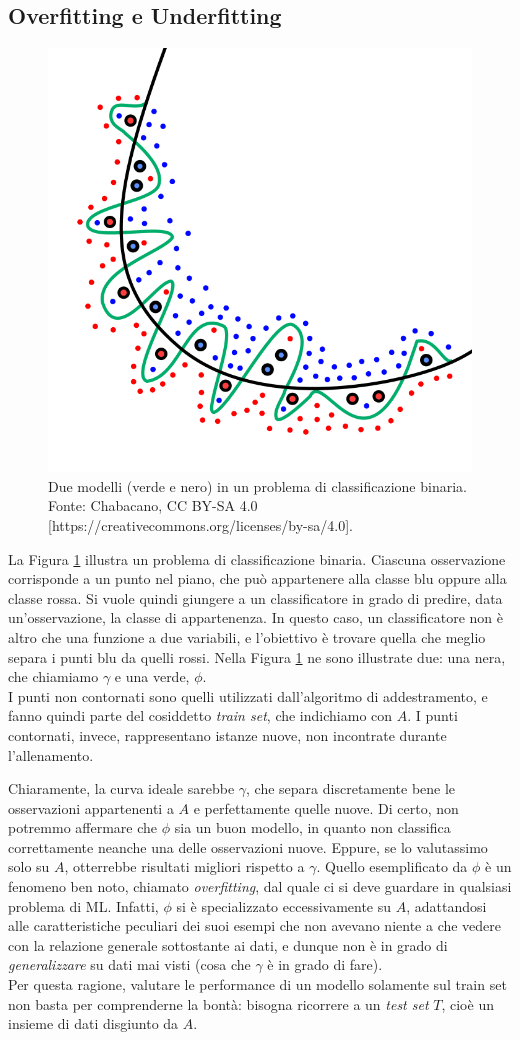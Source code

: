 \subsection{Overfitting e Underfitting}
\label{par:overfitting-underfitting}

\begin{figure}
    \centering
    \includegraphics[width=0.5\linewidth]{images/overfitting.png}
    \caption{Due modelli (verde e nero) in un problema di classificazione binaria. Fonte: Chabacano, CC BY-SA 4.0 [https://creativecommons.org/licenses/by-sa/4.0].}
    \label{fig:overfitting}
\end{figure}

La Figura \ref{fig:overfitting} illustra un problema di classificazione binaria. Ciascuna osservazione corrisponde a un punto nel piano, che può appartenere alla classe blu oppure alla classe rossa. Si vuole quindi giungere a un classificatore in grado di predire, data un'osservazione, la classe di appartenenza. In questo caso, un classificatore non è altro che una funzione a due variabili, e l'obiettivo è trovare quella che meglio separa i punti blu da quelli rossi. Nella Figura \ref{fig:overfitting} ne sono illustrate due: una nera, che chiamiamo $\gamma$ e una verde, $\phi$.\\
I punti non contornati sono quelli utilizzati dall'algoritmo di addestramento, e fanno quindi parte del cosiddetto \textit{train set}, che indichiamo con $A$. I punti contornati, invece, rappresentano istanze nuove, non incontrate durante l'allenamento.

Chiaramente, la curva ideale sarebbe $\gamma$, che separa discretamente bene le osservazioni appartenenti a $A$ e perfettamente quelle nuove. Di certo, non potremmo affermare che $\phi$ sia un buon modello, in quanto non classifica correttamente neanche una delle osservazioni nuove. Eppure, se lo valutassimo solo su $A$, otterrebbe risultati migliori rispetto a $\gamma$. Quello esemplificato da $\phi$ è un fenomeno ben noto, chiamato \textit{overfitting}, dal quale ci si deve guardare in qualsiasi problema di ML. Infatti, $\phi$ si è specializzato eccessivamente su $A$, adattandosi alle caratteristiche peculiari dei suoi esempi che non avevano niente a che vedere con la relazione generale sottostante ai dati, e dunque non è in grado di \textit{generalizzare} su dati mai visti (cosa che $\gamma$ è in grado di fare).\\
Per questa ragione, valutare le performance di un modello solamente sul train set non basta per comprenderne la bontà: bisogna ricorrere a un \textit{test set} $T$, cioè un insieme di dati disgiunto da $A$.

